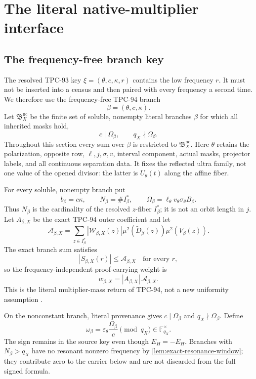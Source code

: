 \section{The literal native-multiplier interface}
\label{sec:native-interface}

\subsection{The frequency-free branch key}

The resolved TPC-93 key
\(\xi=(\theta,c,\kappa,r)\) contains the low frequency \(r\).
It must not be inserted into a census and then paired with every
frequency a second time.  We therefore use the frequency-free
TPC-94 branch
\[
 \beta=(\theta,c,\kappa).
\]
Let \(\mathfrak B_X^{\mathrm{nc}}\) be the finite set of soluble,
nonempty literal branches \(\beta\) for which all inherited masks
hold,
\[
 c\mid\Omega_\beta,\qquad q_X\nmid\Omega_\beta.
\]
Throughout this section every sum over \(\beta\) is restricted to
\(\mathfrak B_X^{\mathrm{nc}}\).
Here \(\theta\) retains the polarization, opposite row,
\(\ell,j,\sigma,v\), interval component, actual masks, projector
labels, and all continuous separation data.  It fixes the reflected
ultra family, not one value of the opened divisor: the latter is
\(U_\theta(t)\) along the affine fiber.

For every soluble, nonempty branch put
\[
 b_\beta=c\kappa,\qquad
 N_\beta=\#I_\beta^\ast,\qquad
 \Omega_\beta=\ell_\theta v_\theta\sigma_\theta B_\beta.
\]
Thus \(N_\beta\) is the cardinality of the resolved
\(z\)-fiber \(I_\beta^\ast\); it is not an orbit length in \(j\).
Let \(A_{\beta,X}\) be the exact TPC-94 outer coefficient and let
\begin{equation}
 \mathcal A_{\beta,X}
 =
 \sum_{z\in I_\beta^\ast}
 |\mathcal W_{\beta,X}(z)|
 \mu^2(\widetilde D_\beta(z))
 \mu^2(V_\beta(z)).
\label{eq:uniform-branch-mass}
\end{equation}
The exact branch sum satisfies
\[
 |S_{\beta,X}(r)|\le\mathcal A_{\beta,X}
 \quad\text{for every }r,
\]
so the frequency-independent proof-carrying weight is
\begin{equation}
 w_{\beta,X}
 =
 |A_{\beta,X}|\,\mathcal A_{\beta,X}.
\label{eq:base-branch-weight}
\end{equation}
This is the literal multiplier-mass return of TPC-94, not a new
uniformity assumption \citep{WangTPC94}.

On the nonconstant branch, literal provenance gives
\(c\mid\Omega_\beta\) and \(q_X\nmid\Omega_\beta\).  Define
\begin{equation}
 \omega_\beta
 =
 \varepsilon_\theta\frac{\Omega_\beta}{c}
 \pmod{q_X}
 \in\mathbb F_{q_X}^{\times}.
\label{eq:native-omega}
\end{equation}
The sign remains in the source key even though \(E_H=-E_H\).
Branches with \(N_\beta>q_X\) have no resonant nonzero frequency by
\cref{lem:exact-resonance-window}; they contribute zero to the
carrier below and are not discarded from the full signed formula.

